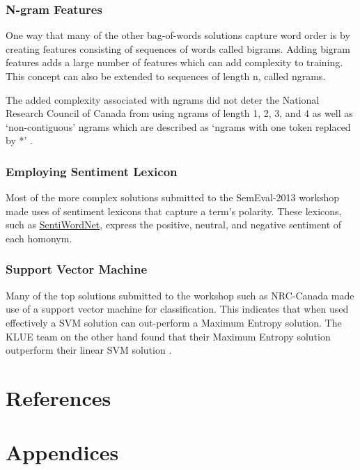 \documentclass[final,3p,12pt]{elsarticle}
\begin{document}
\subsubsection{N-gram Features}
\label{sssection:ngram}

One way that many of the other bag-of-words solutions capture word order is by
creating features consisting of sequences of words called bigrams. Adding
bigram features adds a large number of features which can add complexity to
training. This concept can also be extended to sequences of length n, called
ngrams.

The added complexity associated with ngrams did not deter the National Research
Council of Canada from using ngrams of length 1, 2, 3, and 4 as well as
`non-contiguous' ngrams which are described as `ngrams with one token replaced
by *' \cite{Mohammad2013}.

\subsubsection{Employing Sentiment Lexicon}
\label{sssection:sentimentlexicon}

Most of the more complex solutions submitted to the SemEval-2013 workshop made
uses of sentiment lexicons that capture a term's polarity. These lexicons, such
as \href{http://sentiwordnet.isti.cnr.it/}{SentiWordNet}, express the positive,
neutral, and negative sentiment of each homonym.

\subsubsection{Support Vector Machine}
\label{sssection:svm}

Many of the top solutions submitted to the workshop such as NRC-Canada
\cite{Mohammad2013} made use of a support vector machine for classification.
This indicates that when used effectively a SVM solution can out-perform a
Maximum Entropy solution. The KLUE team on the other hand found that their
Maximum Entropy solution outperform their linear SVM solution
\cite{Proisl2013}.

\section{References}
\label{section:referances}

\nocite{*}



\section{Appendices}
\label{section:appendices}
\end{document}

